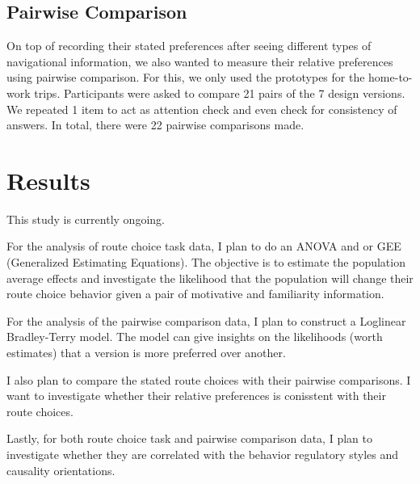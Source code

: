 \subsection{Pairwise Comparison}
On top of recording their stated preferences after seeing different types of navigational information, we also wanted to measure their relative preferences using pairwise comparison. For this, we only used the prototypes for the home-to-work trips. Participants were asked to compare 21 pairs of the 7 design versions. We repeated 1 item to act as attention check and even check for consistency of answers. In total, there were 22 pairwise comparisons made.

\section{Results}
This study is currently ongoing.

For the analysis of route choice task data, I plan to do an ANOVA and or GEE (Generalized Estimating Equations). The objective is to estimate the population average effects and investigate the likelihood that the population will change their route choice behavior given a pair of motivative and familiarity information.

For the analysis of the pairwise comparison data, I plan to construct a  Loglinear Bradley-Terry model. The model can give insights on the likelihoods (worth estimates) that a version is more preferred over another.

I also plan to compare the stated route choices with their pairwise comparisons. I want to investigate whether their relative preferences is conisstent with their route choices. 

Lastly, for both route choice task and pairwise comparison data, I plan to investigate whether they are correlated with the behavior regulatory styles and causality orientations.
